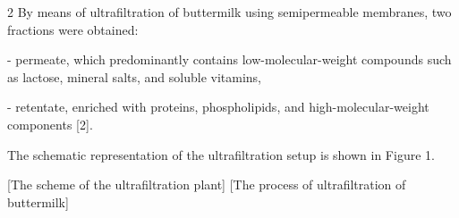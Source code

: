 \begin{multicols}{2}
By means of ultrafiltration of buttermilk using semipermeable membranes,
two fractions were obtained:

- permeate, which predominantly contains low-molecular-weight compounds
such as lactose, mineral salts, and soluble vitamins,

- retentate, enriched with proteins, phospholipids, and
high-molecular-weight components {[}2{]}.

The schematic representation of the ultrafiltration setup is shown in
Figure 1.
\end{multicols}

\begin{figs}
    [The scheme of the ultrafiltration plant]
    [The process
of ultrafiltration of buttermilk]
\end{figs}

